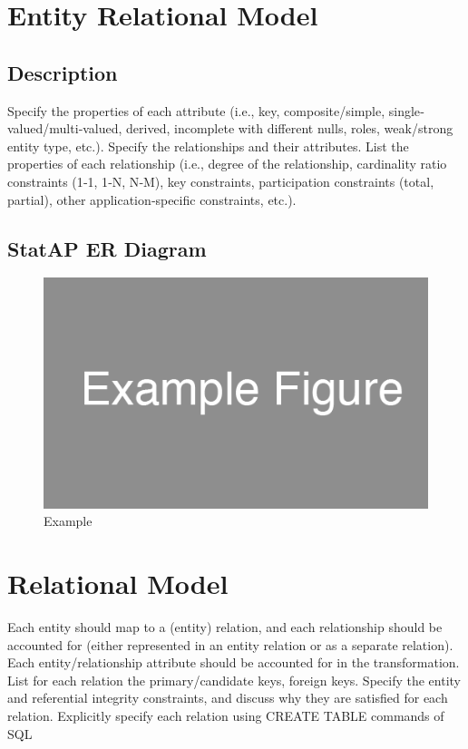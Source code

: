 \documentclass[12pt,letterpaper]{article}
\begin{document}
\clearpage\null

\section{Entity Relational Model}
\subsection{Description}
Specify the properties of each attribute (i.e., key, composite/simple, single‐valued/multi‐valued, derived, incomplete with different nulls, roles, weak/strong entity type, etc.). Specify the relationships and their attributes. List the properties of each relationship (i.e., degree of the relationship, cardinality ratio constraints (1‐1, 1‐N, N‐M), key constraints, participation constraints (total, partial), other application‐specific constraints, etc.).

\subsection{StatAP ER Diagram}
\begin{figure}
\centering
\includegraphics[scale=0.35]{images/example_figure.png}
\caption{Example}
\label{fig:home}
\end{figure}

\clearpage\null

\section{Relational Model}
Each entity should map to a (entity) relation, and each relationship should be accounted for (either represented in an entity relation or as a separate relation). Each entity/relationship attribute should be accounted for in the transformation. List for
each relation the primary/candidate keys, foreign keys. Specify the entity and referential integrity constraints, and discuss why they are satisfied for each relation. Explicitly specify each relation using CREATE TABLE commands of SQL
\end{document}
